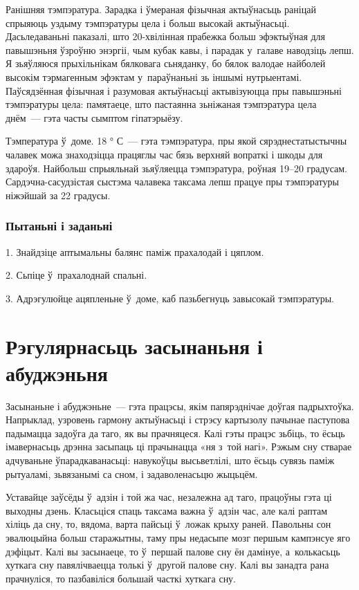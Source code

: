 Ранішняя тэмпэратура. Зарадка і ўмераная фізычная актыўнасьць раніцай спрыяюць уздыму тэмпэратуры цела і больш высокай актыўнасьці. Дасьледаваньні паказалі, што 20-хвілінная прабежка больш эфэктыўная для павышэньня ўзроўню энэргіі, чым кубак кавы, і парадак у~галаве наводзіць лепш. Я зьяўляюся прыхільнікам бялковага сьняданку, бо бялок валодае найболей высокім тэрмагенным эфэктам у~параўнаньні зь іншымі нутрыентамі. Паўсядзённая фізычная і разумовая актыўнасьці актывізуюцца пры павышэньні тэмпэратуры цела: памятаеце, што пастаянна зьніжаная тэмпэратура цела днём~--- гэта часты сымптом гіпатэрыёзу.

Тэмпература ў~доме. 18 ° С~--- гэта тэмпэратура, пры якой сярэднестатыстычны чалавек можа знаходзіцца працяглы час бязь верхняй вопраткі і шкоды для здароўя. Найбольш спрыяльнай зьяўляецца тэмпэратура, роўная 19--20 градусам. Сардэчна-сасудзістая сыстэма чалавека таксама лепш працуе пры тэмпэратуры ніжэйшай за 22 градусы.

\subsubsection{Пытаньні і заданьні}

1. Знайдзіце аптымальны балянс паміж прахалодай і цяплом.

2. Сьпіце ў~прахалоднай спальні.

3. Адрэгулюйце ацяпленьне ў~доме, каб пазьбегнуць завысокай тэмпэратуры.


\section{Рэгулярнасьць засынаньня і абуджэньня}

Засынаньне і абуджэньне~--- гэта працэсы, якім папярэднічае доўгая падрыхтоўка. Напрыклад, узровень гармону актыўнасьці і стрэсу картызолу пачынае паступова падымацца задоўга да таго, як вы прачняцеся. Калі гэты працэс зьбіць, то ёсьць імавернасьць дрэнна засыпаць ці прачынацца «ня з~той нагі». Рэжым сну стварае адчуваньне ўпарадкаванасьці: навукоўцы высьветлілі, што ёсьць сувязь паміж рытуаламі, зьвязанымі са сном, і задаволенасьцю жыцьцём.

Уставайце заўсёды ў~адзін і той жа час, незалежна ад таго, працоўны гэта ці выходны дзень. Класьціся спаць таксама важна ў~адзін час, але калі раптам хіліць да сну, то, вядома, варта пайсьці ў~ложак крыху раней. Павольны сон эвалюцыйна больш старажытны, таму пры недасыпе мозг першым кампэнсуе яго дэфіцыт. Калі вы засынаеце, то ў~першай палове сну ён дамінуе, а~колькасьць хуткага сну павялічваецца толькі ў~другой палове сну. Калі вы занадта рана прачнуліся, то пазбавіліся большай часткі хуткага сну.


